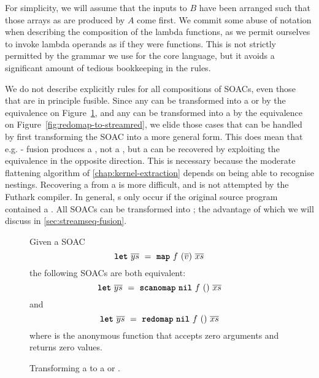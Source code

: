 For simplicity, we will assume that the inputs to $B$ have been
arranged such that those arrays as are produced by $A$ come first.  We
commit some abuse of notation when describing the composition of the
lambda functions, as we permit ourselves to invoke lambda operands as
if they were functions.  This is not strictly permitted by the grammar
we use for the core language, but it avoids a significant amount of
tedious bookkeeping in the rules.

We do not describe explicitly rules for all compositions of SOACs,
even those that are in principle fusible.  Since any  can be
transformed into a  or  by the equivalence on
Figure~\ref{fig:map-to-scanomap-or-redomap}, and any  can
be transformed into a \StreamPar by the equivalence on
Figure~\ref{fig:redomap-to-streamred}, we elide those cases that can
be handled by first transforming the SOAC into a more general form.
This does mean that e.g. - fusion produces a
, not a , but a  can be recovered by
exploiting the equivalence in the opposite direction.  This is
necessary because the moderate flattening algorithm of
\cref{chap:kernel-extraction} depends on being able to recognise
 nestings.  Recovering a  from a \StreamPar is
more difficult, and is not attempted by the Futhark compiler.  In
general, \StreamPar{}s only occur if the original source program
contained a \StreamRed{}.  All SOACs can be transformed into
\StreamSeq; the advantage of which we will discuss in
\cref{sec:streamseq-fusion}.

\begin{figure}[bt]
  Given a SOAC
\[
  \mbox{\texttt{\bfseries{let}}}~\overline{ys}~=~\mbox{\texttt{\bfseries{map}}}~f~(\overline{v})~\overline{xs}
\]
the following SOACs are both equivalent:
\[
  \mbox{\texttt{\bfseries{let}}}~\overline{ys}~=~\mbox{\texttt{\bfseries{scanomap}}}~\mbox{\texttt{\bfseries{nil}}}~f~()~\overline{xs}
\]
and
\[
  \mbox{\texttt{\bfseries{let}}}~\overline{ys}~=~\mbox{\texttt{\bfseries{redomap}}}~\mbox{\texttt{\bfseries{nil}}}~f~()~\overline{xs}
\]
where  is the anonymous function that accepts zero arguments
and returns zero values.
  \caption{Transforming a  to a  or .}
  \label{fig:map-to-scanomap-or-redomap}
\end{figure}

